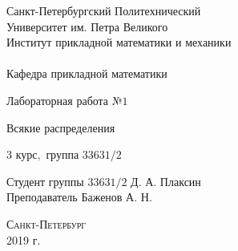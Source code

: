 \documentclass[a4]{article}
\begin{document}
\def\contentsname{\LARGE{Содержание}}
\thispagestyle{empty}
\begin{center} 

\vspace{2cm} 
{\Large \sc Санкт-Петербургский Политехнический}\\
\vspace{2mm}
{\Large \sc Университет} им. {\Large\sc Петра Великого}\\
\vspace{1cm}
{\large \sc Институт прикладной математики и механики\\ 
\vspace{0.5mm}
\textsc{}}\\ 
\vspace{0.5mm}
{\large\sc Кафедра прикладной математики}\\
\vspace{15mm}


{\huge \sc Лабораторная работа №$1$
\vspace{6mm}

Всякие распределения
 }
\vspace*{2mm}


\vspace{1cm}

{\sc $3$ курс$,$ группа $33631/2$}

\vspace{2cm} 
Студент группы $33631/2$ \hfill Д. А. Плаксин\\
\vspace{1cm}
Преподаватель \hfill Баженов А. Н.\\
\vspace{20mm} 

\end{center} 
\begin{center}
\vfill {\large\textsc{Санкт-Петербург}}\\ 
2019 г.
\end{center}

\end{document}
